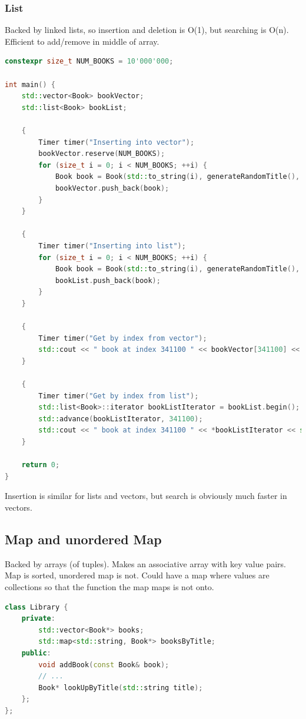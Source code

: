 \documentclass{report}
\begin{document}
\subsubsection{List}

Backed by linked lists, so insertion and deletion is O(1), but searching is O(n). Efficient to add/remove in middle of array.

\begin{lstlisting}[language=C++]
constexpr size_t NUM_BOOKS = 10'000'000;

int main() {
	std::vector<Book> bookVector;
	std::list<Book> bookList;

	{
		Timer timer("Inserting into vector");
		bookVector.reserve(NUM_BOOKS);
		for (size_t i = 0; i < NUM_BOOKS; ++i) {
			Book book = Book(std::to_string(i), generateRandomTitle(), "A. Author", getRandomInt(1900, 2025));
			bookVector.push_back(book);
		}
	}

	{
		Timer timer("Inserting into list");
		for (size_t i = 0; i < NUM_BOOKS; ++i) {
			Book book = Book(std::to_string(i), generateRandomTitle(), "A. Author", getRandomInt(1900, 2025));
			bookList.push_back(book);
		}
	}

	{
		Timer timer("Get by index from vector");
		std::cout << " book at index 341100 " << bookVector[341100] << std::endl;
	}

	{
		Timer timer("Get by index from list");
		std::list<Book>::iterator bookListIterator = bookList.begin();
		std::advance(bookListIterator, 341100);
		std::cout << " book at index 341100 " << *bookListIterator << std::endl;
	}

	return 0;
}
\end{lstlisting}

Insertion is similar for lists and vectors, but search is obviously much faster in vectors.

\subsection{Map and unordered Map}

Backed by arrays (of tuples). Makes an associative array with key value pairs. Map is sorted, unordered map is not. Could have a map where values are collections so that the function the map maps is not onto.

\begin{lstlisting}[language=C++]
	class Library {
	private:
		std::vector<Book*> books;
		std::map<std::string, Book*> booksByTitle;
	public:
		void addBook(const Book& book);
		// ...
		Book* lookUpByTitle(std::string title);
	};
};

\end{lstlisting}
\end{document}
